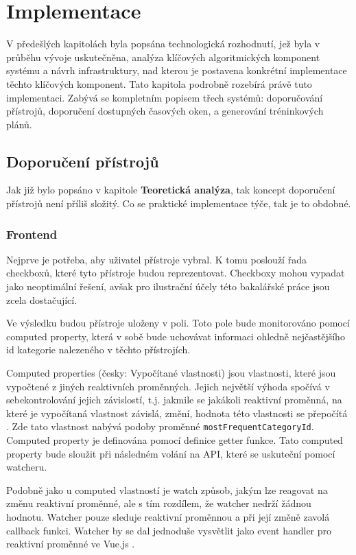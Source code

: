 \chapter{Implementace}
V předešlých kapitolách byla popsána technologická rozhodnutí, jež byla v průběhu vývoje uskutečněna, analýza klíčových algoritmických komponent systému a návrh infrastruktury, nad kterou je postavena konkrétní implementace těchto klíčových komponent. Tato kapitola podrobně rozebírá právě tuto implementaci. Zabývá se kompletním popisem třech systémů: doporučování přístrojů, doporučení dostupných časových oken, a generování tréninkových plánů.

\section{Doporučení přístrojů}
Jak již bylo popsáno v kapitole \textbf{Teoretická analýza}, tak koncept doporučení přístrojů není příliš složitý. Co se praktické implementace týče, tak je to obdobné.

\subsection{Frontend}
Nejprve je potřeba, aby uživatel přístroje vybral. K tomu poslouží řada checkboxů, které tyto přístroje budou reprezentovat. Checkboxy mohou vypadat jako neoptimální řešení, avšak pro ilustrační účely této bakalářské práce jsou zcela dostačující.

Ve výsledku budou přístroje uloženy v poli. Toto pole bude monitorováno pomocí computed property, která v sobě bude uchovávat informaci ohledně nejčastějšího id kategorie nalezeného v těchto přístrojích.

Computed properties (česky: Vypočítané vlastnosti) jsou vlastnosti, které jsou vypočtené z jiných reaktivních proměnných. Jejich největší výhoda spočívá v sebekontrolování jejich závislostí, t.j. jakmile se jakákoli reaktivní proměnná, na které je vypočítaná vlastnost závislá, změní, hodnota této vlastnosti se přepočítá \cite{vuejsVuejsComputed}. Zde tato vlastnost nabývá podoby proměnné \texttt{mostFrequentCategoryId}. Computed property je definována pomocí definice getter funkce. Tato computed property bude sloužit při následném volání na API, které se uskuteční pomocí watcheru.

Podobně jako u computed vlastností je watch způsob, jakým lze reagovat na změnu reaktivní proměnné, ale s tím rozdílem, že watcher nedrží žádnou hodnotu. Watcher pouze sleduje reaktivní proměnnou a při její změně zavolá callback funkci. Watcher by se dal jednoduše vysvětlit jako event handler pro reaktivní proměnné ve Vue.js \cite{vuejsVuejsWatchers}.

